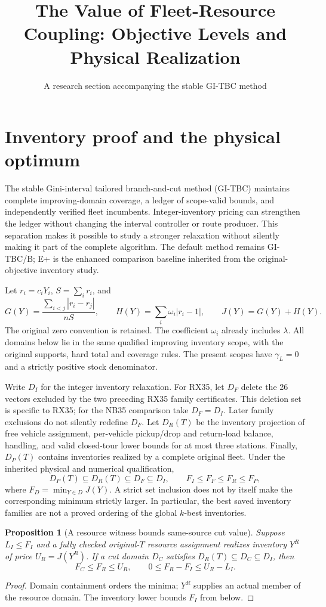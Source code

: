 \documentclass[11pt]{article}
\title{The Value of Fleet-Resource Coupling: Objective Levels and Physical Realization}
\author{A research section accompanying the stable GI-TBC method}
\date{}
\newtheorem{proposition}{Proposition}
\begin{document}
\maketitle

\section{Inventory proof and the physical optimum}
The stable Gini-interval tailored branch-and-cut method (GI-TBC) maintains
complete improving-domain coverage, a ledger of scope-valid bounds, and
independently verified fleet incumbents. Integer-inventory pricing can
strengthen the ledger without changing the interval controller or route
producer. This separation makes it possible to study a stronger relaxation
without silently making it part of the complete algorithm. The default
method remains GI-TBC/B; E+ is the enhanced comparison baseline inherited
from the original-objective inventory study.

Let $r_i=c_iY_i$, $S=\sum_i r_i$, and
\[
 G(Y)=\frac{\sum_{i<j}|r_i-r_j|}{nS},\qquad
 H(Y)=\sum_i\omega_i|r_i-1|,\qquad J(Y)=G(Y)+H(Y).
\]
The original zero convention is retained. The coefficient $\omega_i$
already includes $\lambda$. All domains below lie in the same qualified
improving inventory scope, with the original supports, hard total and
coverage rules. The present scopes have $\gamma_L=0$ and a strictly
positive stock denominator.

Write $D_I$ for the integer inventory relaxation. For RX35, let $D_F$ delete
the 26 vectors excluded by the two preceding RX35 family certificates.
This deletion set is specific to RX35; for the NB35 comparison take
$D_F=D_I$. Later family exclusions do not silently redefine $D_F$.
Let $D_R(T)$ be the inventory projection of free vehicle assignment,
per-vehicle pickup/drop and return-load balance, handling, and valid
closed-tour lower bounds for at most three stations. Finally, $D_P(T)$
contains inventories realized by a complete original fleet. Under the
inherited physical and numerical qualification,
\[
 D_P(T)\subseteq D_R(T)\subseteq D_F\subseteq D_I,
 \qquad F_I\le F_F\le F_R\le F_P,
\]
where $F_D=\min_{Y\in D}J(Y)$. A strict set inclusion does not by itself
make the corresponding minimum strictly larger. In particular, the best
saved inventory families are not a proved ordering of the global
$k$-best inventories.

\begin{proposition}[A resource witness bounds same-source cut value]
Suppose $L_I\le F_I$ and a fully checked original-$T$ resource assignment
realizes inventory $Y^R$ of price $U_R=J(Y^R)$. If a cut domain $D_C$
satisfies $D_R(T)\subseteq D_C\subseteq D_I$, then
\[
 F_C\le F_R\le U_R,\qquad
 0\le F_R-F_I\le U_R-L_I.
\]
\end{proposition}
\begin{proof}
Domain containment orders the minima; $Y^R$ supplies an actual member of
the resource domain. The inventory lower bounds $F_I$ from below.
\end{proof}
\end{document}
